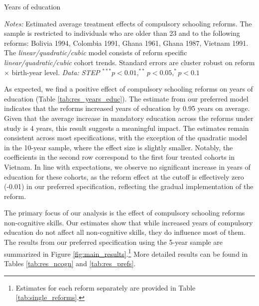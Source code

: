 \begin{table}[htbp]
	\caption{Years of education}
	\label{tab:res_years_educ}
	\centering
	\begin{threeparttable}
		\footnotesize
		
		\begin{tablenotes}
			\footnotesize
			\item \textit{Notes:} Estimated average treatment effects of compulsory schooling reforms. The sample is restricted to individuals who are older than 23 and to the following reforms: Bolivia 1994, Colombia 1991, Ghana 1961, Ghana 1987, Vietnam 1991. The \textit{linear/quadratic/cubic} model consists of reform specific \textit{linear/quadratic/cubic} cohort trends. Standard errors are cluster robust on reform $\times$ birth-year level. \textit{Data: STEP} $^{***} p < 0.01, ^{**} p < 0.05, ^{*} p < 0.1$
		\end{tablenotes}
	\end{threeparttable}
\end{table}


As expected, we find a positive effect of compulsory schooling reforms on years of education (Table \ref{tab:res_years_educ}). The estimate from our preferred model indicates that the reforms increased years of education by 0.95 years on average.  Given that the average increase in mandatory education across the reforms under study is 4 years, this result suggests a meaningful impact. The estimates remain consistent across most specifications, with the exception of the quadratic model in the 10-year sample, where the effect size is slightly smaller. Notably, the coefficients in the second row correspond to the first four treated cohorts in Vietnam. In line with expectations, we observe no significant increase in years of education for these cohorts, as the reform effect at the cutoff is effectively zero (-0.01) in our preferred specification, reflecting the gradual implementation of the reform.

The primary focus of our analysis is the effect of compulsory schooling reforms non-cognitive skills. Our estimates show that while increased years of compulsory education do not affect all non-cognitive skills, they do influence most of them. The results from our preferred specification using the 5-year sample are summarized in Figure \ref{fig:main_results}.\footnote{Estimates for each reform separately are provided in Table \ref{tab:single_reforms}.} More detailed results can be found in Tables \ref{tab:res_ncogn} and \ref{tab:res_prefs}.

